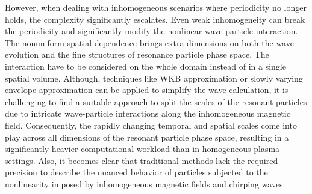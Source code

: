 However, when dealing with inhomogeneous scenarios where periodicity no longer holds, the complexity significantly escalates. Even weak inhomogeneity can break the periodicity and significantly modify the nonlinear wave-particle interaction.
The nonuniform spatial dependence brings extra dimensions on both the wave evolution and the fine structures of resonance particle phase space.
The interaction have to be considered on the whole domain instead of in a single spatial volume.
Although, techniques like WKB approximation \cite{wkb} or slowly varying envelope approximation \cite{svap} can be applied to simplify the wave calculation, it is challenging to find a suitable approach to split the scales of the resonant particles due to intricate wave-particle interactions along the inhomogeneous magnetic field.
Consequently, the rapidly changing temporal and spatial scales come into play across all dimensions of the resonant particle phase space, resulting in a significantly heavier computational workload than in homogeneous plasma settings.
Also, it becomes clear that traditional methods lack the required precision to describe the nuanced behavior of particles subjected to the nonlinearity imposed by inhomogeneous magnetic fields and chirping waves.

